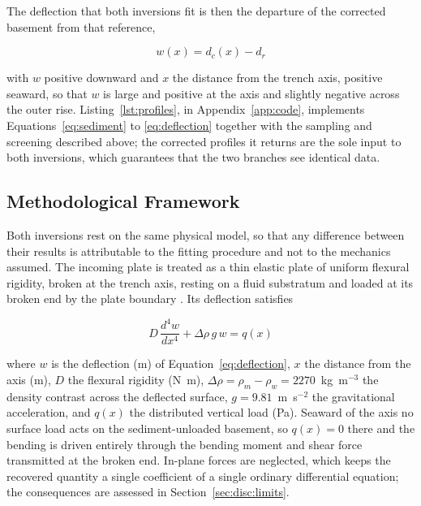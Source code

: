 \documentclass[final]{agujournal2019}
\begin{document}
The deflection that both inversions fit is then the departure of the corrected
basement from that reference,
\begin{linenomath*}
\begin{equation}
  w(x) = d_{c}(x) - d_{r}
  \label{eq:deflection}
\end{equation}
\end{linenomath*}
with $w$ positive downward and $x$ the distance from the trench axis, positive
seaward, so that $w$ is large and positive at the axis and slightly negative
across the outer rise. Listing~\ref{lst:profiles}, in Appendix~\ref{app:code}, implements
Equations~\eqref{eq:sediment} to \eqref{eq:deflection} together with the
sampling and screening described above; the corrected profiles it returns are
the sole input to both inversions, which guarantees that the two branches see
identical data.

\subsection{Methodological Framework}\label{sec:framework}

Both inversions rest on the same physical model, so that any difference between
their results is attributable to the fitting procedure and not to the mechanics
assumed. The incoming plate is treated as a thin elastic plate of uniform
flexural rigidity, broken at the trench axis, resting on a fluid substratum and
loaded at its broken end by the plate boundary
\cite{Kirby2022Flexure,Caldwell1976}. Its deflection satisfies
\begin{linenomath*}
\begin{equation}
  D\,\frac{d^{4}w}{dx^{4}} + \Delta\rho\,g\,w = q(x)
  \label{eq:flexure}
\end{equation}
\end{linenomath*}
where $w$ is the deflection (m) of Equation~\eqref{eq:deflection}, $x$ the
distance from the axis (m), $D$ the flexural rigidity (N~m),
$\Delta\rho = \rho_{m}-\rho_{w} = 2270$~kg~m$^{-3}$ the density contrast across
the deflected surface, $g = 9.81$~m~s$^{-2}$ the gravitational acceleration, and
$q(x)$ the distributed vertical load (Pa). Seaward of the axis no surface load
acts on the sediment-unloaded basement, so $q(x)=0$ there and the bending is
driven entirely through the bending moment and shear force transmitted at the
broken end. In-plane forces are neglected, which keeps the recovered quantity a
single coefficient of a single ordinary differential equation; the consequences
are assessed in Section~\ref{sec:disc:limits}.
\end{document}
